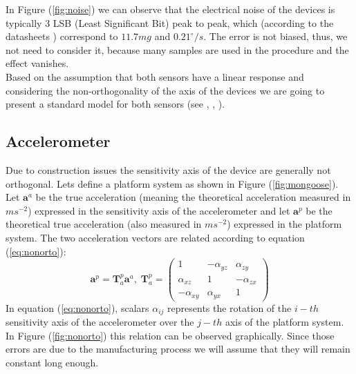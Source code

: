 \documentclass[conference]{IEEEtran}
\newcommand{\refp}[1]{(\ref{#1})}
\begin{document}
In Figure \refp{fig:noise} we can observe that the electrical noise of the devices is typically 3 LSB (Least Significant Bit) peak to peak, which (according to the datasheets \cite{bib:acc_data, bib:gyro_data}) correspond to $11.7 mg$ and $0.21 ^{\circ}/s $. The error is not biased, thus, we not need to consider it, because many samples are used in the procedure and the effect vanishes.\\

Based on the assumption that both sensors have a linear response and considering the non-orthogonality of the axis of the devices we are going to present a standard model for both sensors (see \cite{bib:calib_imu}, \cite{bib:kalman}, \cite{bib:calib_imu_dos}).

\subsection{Accelerometer}
Due to construction issues the sensitivity axis of the device are generally not orthogonal. Lets define a platform system as shown in Figure \refp{fig:mongoose}. Let $\mathbf{a}^a$ be the true acceleration (meaning the theoretical acceleration measured in $ms^{-2}$) expressed in the sensitivity axis of the accelerometer and let $\mathbf{a}^p$ be the theoretical true acceleration (also measured in $ms^{-2}$) expressed in the platform system. The two acceleration vectors are related according to equation \refp{eq:nonorto}:
\begin{equation}
\mathbf{a}^p = \mathbf{T}_a^p\mathbf{a}^a, \; \mathbf{T}_a^p = \left(\begin{array}{ccc}
1 & - \alpha_{yz} & \alpha_{zy}\\
\alpha_{xz} & 1 & - \alpha_{zx}\\
-\alpha_{xy} & \alpha_{yx} & 1
\end{array}\right)
\label{eq:nonorto}
\end{equation}
In equation \refp{eq:nonorto}, scalars $\alpha_{ij}$ represents the rotation of the $i-th$ sensitivity axis of the accelerometer over the $j-th$ axis of the platform system. In Figure \refp{fig:nonorto} this relation can be observed graphically. Since those errors are due to the manufacturing process we will assume that they will remain constant long enough.
\end{document}
